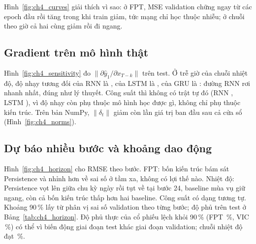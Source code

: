 Hình~\ref{fig:ch4_curves} giải thích vì sao: ở FPT, MSE validation chững ngay từ các epoch đầu rồi tăng trong khi train giảm, tức mạng chỉ học thuộc nhiễu; ở chuỗi theo giờ cả hai cùng giảm rồi đi ngang.

\subsection{Gradient trên mô hình thật}
Hình~\ref{fig:ch4_sensitivity} đo $\|\partial\hat y_1/\partial x_{T-k}\|$ trên test. Ở trễ  giờ của chuỗi nhiệt độ, độ nhạy tương đối của RNN là , của LSTM là , của GRU là : đường RNN rơi nhanh nhất, đúng như lý thuyết. Công suất thì không có trật tự đó (RNN , LSTM ), vì độ nhạy còn phụ thuộc mô hình học được gì, không chỉ phụ thuộc kiến trúc. Trên bản NumPy, $\|\delta_t\|$ giảm còn  lần giá trị ban đầu sau cả cửa sổ (Hình~\ref{fig:ch4_norms}).


\subsection{Dự báo nhiều bước và khoảng dao động}
Hình~\ref{fig:ch4_horizon} cho RMSE theo bước. FPT: bốn kiến trúc bám sát Persistence và nhỉnh hơn về sai số ở tầm xa, không có lợi thế nào. Nhiệt độ: Persistence vọt lên giữa chu kỳ ngày rồi tụt về tại bước 24, baseline mùa vụ giữ ngang, còn cả bốn kiến trúc thấp hơn hai baseline. Công suất có dạng tương tự. Khoảng 90\,\% lấy từ phân vị sai số validation theo từng bước; độ phủ trên test ở Bảng~\ref{tab:ch4_horizon}. Độ phủ thực của cổ phiếu lệch khỏi 90\,\% (FPT \,\%, VIC \,\%) có thể vì biến động giai đoạn test khác giai đoạn validation; chuỗi nhiệt độ đạt \,\%.


